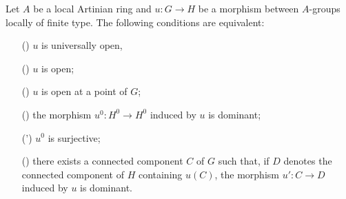 \begin{corollary}\label{scheme alg group morphism open iff}
Let $A$ be a local Artinian ring and $u:G\to H$ be a morphism between $A$-groups locally of finite type. The following conditions are equivalent:
\begin{enumerate}
    \item[(\rmnum{1})] $u$ is universally open,
    \item[(\rmnum{2})] $u$ is open;
    \item[(\rmnum{3})] $u$ is open at a point of $G$;
    \item[(\rmnum{4})] the morphism $u^0:H^0\to H^0$ induced by $u$ is dominant;
    \item[(\rmnum{4}')] $u^0$ is surjective;
    \item[(\rmnum{5})] there exists a connected component $C$ of $G$ such that, if $D$ denotes the connected component of $H$ containing $u(C)$, the morphism $u':C\to D$ induced by $u$ is dominant.
\end{enumerate}
\end{corollary}
